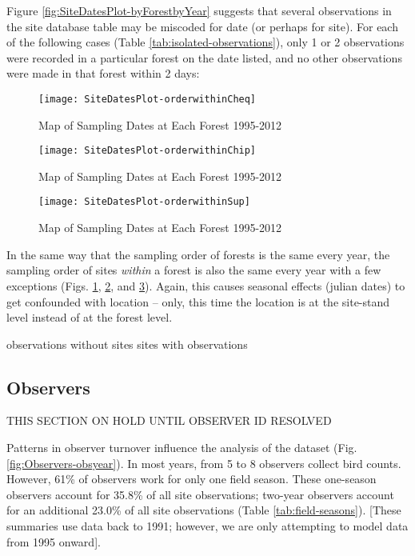 Figure \ref{fig:SiteDatesPlot-byForestbyYear} suggests that several observations in the site database table may be miscoded for date (or perhaps for site).  For each of the following cases (Table \ref{tab:isolated-observations}), only 1 or 2 observations were recorded in a particular forest on the date listed, and no other observations were made in that forest within 2 days:



\begin{figure}
\texttt{[image: SiteDatesPlot-orderwithinCheq]}
\caption{Map of Sampling Dates at Each Forest 1995-2012}
\label{fig:SiteDatesPlot-orderwithinCheq}
\end{figure}

\begin{figure}
\texttt{[image: SiteDatesPlot-orderwithinChip]}
\caption{Map of Sampling Dates at Each Forest 1995-2012}
\label{fig:SiteDatesPlot-orderwithinChip}
\end{figure}

\begin{figure}
\texttt{[image: SiteDatesPlot-orderwithinSup]}
\caption{Map of Sampling Dates at Each Forest 1995-2012}
\label{fig:SiteDatesPlot-orderwithinSup}
\end{figure}

In the same way that the sampling order of forests is the same every year, the sampling order of sites \textit{within} a forest is also the same every year with a few exceptions (Figs. \ref{fig:SiteDatesPlot-orderwithinCheq}, \ref{fig:SiteDatesPlot-orderwithinChip}, and \ref{fig:SiteDatesPlot-orderwithinSup}).  Again, this causes seasonal effects (julian dates) to get confounded with location -- only, this time the location is at the site-stand level instead of at the forest level.


observations without sites
sites with observations



\subsection{Observers}

THIS SECTION ON HOLD UNTIL OBSERVER ID RESOLVED

Patterns in observer turnover influence the analysis of the dataset (Fig. \ref{fig:Observers-obsyear}).  In most years, from 5 to 8 observers collect bird counts.  However, 61\% of observers work for only one field season.  These one-season observers account for 35.8\% of all site observations; two-year observers account for an additional 23.0\% of all site observations (Table \ref{tab:field-seasons}).  [These summaries use data back to 1991; however, we are only attempting to model data from 1995 onward].

